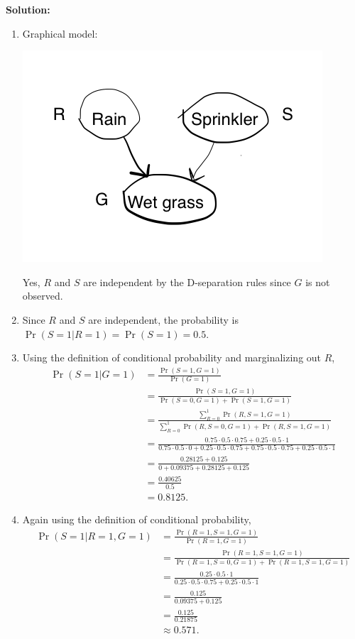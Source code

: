 \documentclass[submit]{harvardml}
\begin{document}
\textbf{Solution:}
\begin{enumerate}
	\item Graphical model:
	
	\includegraphics{graphical_model}
	
	Yes, $R$ and $S$ are independent by the D-separation rules since $G$ is not observed.
	
	\item Since $R$ and $S$ are independent, the probability is $\Pr(S = 1 | R = 1) = \Pr(S = 1) = 0.5$.
	
	\item Using the definition of conditional probability and marginalizing out $R$,
	\begin{align*}
		\Pr(S = 1 | G = 1) &= \frac{\Pr(S = 1, G = 1)}{\Pr(G = 1)} \\
		&= \frac{\Pr(S = 1, G = 1)}{\Pr(S = 0, G = 1) + \Pr(S = 1, G = 1)} \\
		&= \frac{\sum_{R=0}^1 \Pr(R, S = 1, G = 1)}{\sum_{R=0}^1 \Pr(R, S = 0, G = 1) + \Pr(R, S = 1, G = 1)} \\
		&= \frac{0.75 \cdot 0.5 \cdot 0.75 + 0.25 \cdot 0.5 \cdot 1}{0.75 \cdot 0.5 \cdot 0 + 0.25 \cdot 0.5 \cdot 0.75 + 0.75 \cdot 0.5 \cdot 0.75 + 0.25 \cdot 0.5 \cdot 1} \\
		&= \frac{0.28125 + 0.125}{0 + 0.09375 + 0.28125 + 0.125} \\
		&= \frac{0.40625}{0.5} \\
		&= 0.8125.
	\end{align*}
	
	\item Again using the definition of conditional probability,
	\begin{align*}
		\Pr(S = 1 | R = 1, G = 1) &= \frac{\Pr(R = 1, S = 1, G = 1)}{\Pr(R = 1, G = 1)} \\
		&= \frac{\Pr(R = 1, S = 1, G = 1)}{\Pr(R = 1, S = 0, G = 1) + \Pr(R = 1, S = 1, G = 1)} \\
		&= \frac{0.25 \cdot 0.5 \cdot 1}{0.25 \cdot 0.5 \cdot 0.75 + 0.25 \cdot 0.5 \cdot 1} \\
		&= \frac{0.125}{0.09375 + 0.125} \\
		&= \frac{0.125}{0.21875} \\
		&\approx 0.571.
	\end{align*}
	

\end{enumerate}
\end{document}
